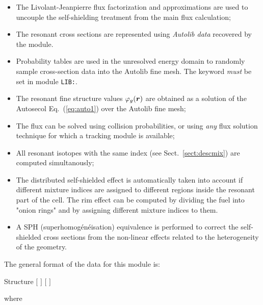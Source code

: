 \begin{itemize}
\item The Livolant-Jeanpierre flux factorization and approximations are used to
uncouple the self-shielding treatment from the main flux calculation;
\item The resonant cross sections are represented using {\sl Autolib data} 
recovered by the  module.
\item Probability tables are used in the unresolved energy domain to randomly
sample cross-section data into the Autolib fine mesh. The keyword  {\sl must} be
set in module {\tt LIB:}.
\item The resonant fine structure values $\varphi_g(\bff(r))$ are obtained as a solution
of the Autosecol Eq.~(\ref{eq:auto1}) over the Autolib fine mesh;
\item The flux can be solved using collision probabilities, or using {\sl any}
flux solution technique for which a tracking module is available;
\item All resonant isotopes with the same  index (see Sect.~\ref{sect:descmix})
are computed simultanously;
\item The distributed self-shielded effect is automatically taken into account
if different mixture indices are assigned to different regions inside the
resonant part of the cell. The rim effect can be computed by dividing the fuel
into "onion rings" and by assigning different mixture indices to them. 
\item A SPH (superhomog\'en\'eisation) equivalence is performed to correct the
self-shielded cross sections from the non-linear effects related to the
heterogeneity of the geometry.
\end{itemize}

\vskip 0.2cm

The general format of the data for this module is:

\begin{DataStructure}{Structure }
 \moc{:=}   $[$  $]$
 $[$  $]$ \moc{::} 
\end{DataStructure}

\noindent where

